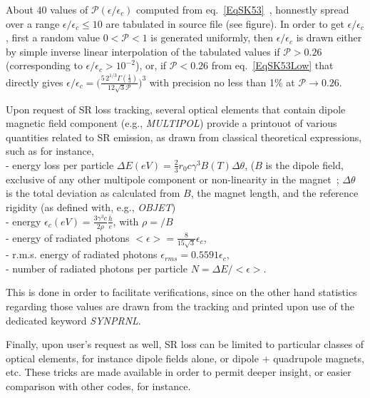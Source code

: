  About $40$ values of $\mathcal{P}(\epsilon/\epsilon_c)$ computed from eq.~\ref{EqSK53}~\cite{VOKostroun}, 
honnestly spread  over a range $\epsilon/\epsilon_c \leq 10$ are  tabulated 
in \zgoubi source file (see figure). In 
order to get $\epsilon/\epsilon_c$, first a random value $0<\mathcal{P}<1$ is generated uniformly, 
then  $\epsilon/\epsilon_c$ is drawn either  by simple inverse linear interpolation 
 of the tabulated values if $\mathcal{P}>0.26$ (corresponding to 
$\epsilon/\epsilon_c>10^{-2}$), 
or, if $\mathcal{P}<0.26$ from eq.~\ref{EqSK53Low} that directly gives 
 $\epsilon/\epsilon_c= \bigl( \frac{5 \, 2^{1/3} \Gamma(\frac{1}{3})}{12 \sqrt{3} \mathcal{P}}\bigr)^3$ 
 with precision no less than 1$\%$ at  $\mathcal{P}\rightarrow 0.26$. 

\bigskip


Upon request of SR loss tracking, several optical elements that contain dipole 
magnetic field component (e.g., \textsl{MULTIPOL}) provide a printouot of various 
 quantities related to SR emission, as drawn from classical theoretical 
expressions, such as for instance, \\
- energy loss per particle $\Delta E(eV)= \frac{2}{3}r_0 c \gamma^3 B(T) \Delta \theta$,   ($B$ 
is the dipole field, exclusive of any other multipole component or non-linearity 
in the magnet~; $\Delta \theta$ is the total deviation as calculated from $B$, the 
magnet length, and the reference rigidity \BORO (as defined with, e.g., \textsl{OBJET}) \\
- energy $\epsilon_c(eV)=\frac{3 \gamma^3 c}{2 \rho} \frac{\bar{h}}{e}$, with 
$\rho =$\BORO$/B$ \\
- energy of radiated photons $<\epsilon> = \frac{8}{15 \sqrt{3}} \epsilon_c$, \\ 
- r.m.s. energy of radiated photons $\epsilon_{rms} = 0.5591 \epsilon_c$, \\
- number of radiated photons per particle  $N = \Delta E /<\epsilon>$.  

This is done in order to facilitate verifications, since on the other hand statistics 
regarding those values are drawn from the tracking and printed upon use of the dedicated 
keyword \textsl{SYNPRNL}. 



\bigskip

Finally, upon user's request as well,  SR loss can be limited to particular classes of optical 
elements, for instance dipole fields alone, or dipole + quadrupole magnets, etc. These tricks 
are made available in order to permit deeper insight, or easier comparison with other codes, 
for instance. 

